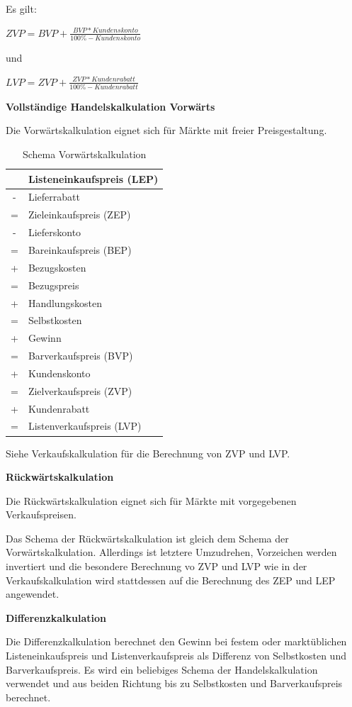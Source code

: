 Es gilt:

$ZVP = BVP + \frac{BVP * Kundenskonto}{100\% - Kundenskonto}$

und

$LVP = ZVP + \frac{ZVP * Kundenrabatt}{100\% - Kundenrabatt}$

\textbf{Vollständige Handelskalkulation Vorwärts}

Die Vorwärtskalkulation eignet sich für Märkte mit freier Preisgestaltung.

\begin{table}
    [H]
    \centering
    \begin{tabularx}{\textwidth}{c|X}
          & Listeneinkaufspreis (LEP) \\
        \hline
        - & Lieferrabatt              \\
        \hline
        = & Zieleinkaufspreis (ZEP)   \\
        \hline
        - & Lieferskonto              \\
        \hline
        = & Bareinkaufspreis (BEP)    \\
        \hline
        + & Bezugskosten              \\
        \hline
        = & Bezugspreis               \\
        \hline
        + & Handlungskosten           \\
        \hline
        = & Selbstkosten              \\
        \hline
        + & Gewinn                    \\
        \hline
        = & Barverkaufspreis (BVP)    \\
        \hline
        + & Kundenskonto              \\
        \hline
        = & Zielverkaufspreis (ZVP)   \\
        \hline
        + & Kundenrabatt              \\
        \hline
        = & Listenverkaufspreis (LVP) \\
    \end{tabularx}
    \caption{Schema Vorwärtskalkulation}
    \label{tab:vorwaertskalkulation}
\end{table}

Siehe Verkaufskalkulation für die Berechnung von ZVP und LVP.

\textbf{Rückwärtskalkulation}

Die Rückwärtskalkulation eignet sich für Märkte mit vorgegebenen Verkaufspreisen.

Das Schema der Rückwärtskalkulation ist gleich dem Schema der Vorwärtskalkulation. Allerdings ist letztere Umzudrehen, Vorzeichen werden invertiert und die besondere Berechnung vo ZVP und LVP wie in der Verkaufskalkulation wird stattdessen auf die Berechnung des ZEP und LEP angewendet.

\textbf{Differenzkalkulation}

Die Differenzkalkulation berechnet den Gewinn bei festem oder marktüblichen Listeneinkaufspreis und Listenverkaufspreis als Differenz von Selbstkosten und Barverkaufspreis. Es wird ein beliebiges Schema der Handelskalkulation verwendet und aus beiden Richtung bis zu Selbstkosten und Barverkaufspreis berechnet.